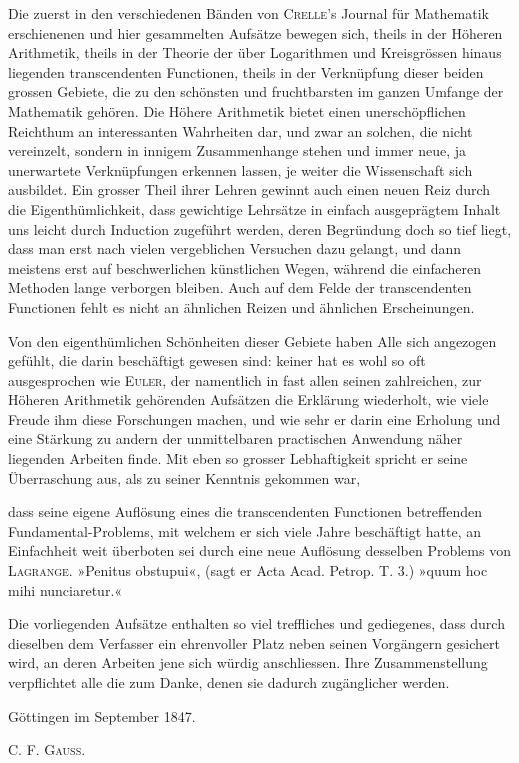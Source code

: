 \NoSourceHead
{}

Die zuerst in den verschiedenen Bänden von \textsc{Crelle}'s Journal für Mathematik erschienenen und hier gesammelten Aufsätze bewegen sich, theils in der Höheren Arithmetik, theils in der Theorie der über Logarithmen und Kreisgrössen hinaus liegenden transcendenten Functionen, theils in der Verknüpfung dieser beiden grossen Gebiete, die zu den schönsten und fruchtbarsten im ganzen Umfange der Mathematik gehören. Die Höhere Arithmetik bietet einen unerschöpflichen Reichthum an interessanten Wahrheiten dar, und zwar an solchen, die nicht vereinzelt, sondern in innigem Zusammenhange stehen und immer neue, ja unerwartete Verknüpfungen erkennen lassen, je weiter die Wissenschaft sich ausbildet. Ein grosser Theil ihrer Lehren gewinnt auch einen neuen Reiz durch die Eigenthümlichkeit, dass gewichtige Lehrsätze in einfach ausgeprägtem Inhalt uns leicht durch Induction zugeführt werden, deren Begründung doch so tief liegt, dass man erst nach vielen vergeblichen Versuchen dazu gelangt, und dann meistens erst auf beschwerlichen künstlichen Wegen, während die einfacheren Methoden lange verborgen bleiben. Auch auf dem Felde der transcendenten Functionen fehlt es nicht an ähnlichen Reizen und ähnlichen Erscheinungen.

Von den eigenthümlichen Schönheiten dieser Gebiete haben Alle sich angezogen gefühlt, die darin beschäftigt gewesen sind: keiner hat es wohl so oft ausgesprochen wie \textsc{Euler}, der namentlich in fast allen seinen zahlreichen, zur Höheren Arithmetik gehörenden Aufsätzen die Erklärung wiederholt, wie viele Freude ihm diese Forschungen machen, und wie sehr er darin eine Erholung und eine Stärkung zu andern der unmittelbaren practischen Anwendung näher liegenden Arbeiten finde. Mit eben so grosser Lebhaftigkeit spricht er seine Überraschung aus, als zu seiner Kenntnis gekommen war,
\par\clearpage{}\noindent
dass seine eigene Auflösung eines die transcendenten Functionen betreffenden Fundamen\-tal-Problems, mit welchem er sich viele Jahre beschäftigt hatte, an Einfachheit weit überboten sei durch eine neue Auflösung desselben Problems von \textsc{Lagrange}. »Penitus obstupui«, (sagt er Acta Acad. Petrop. T. 3.) »quum hoc mihi nunciaretur.«

Die vorliegenden Aufsätze enthalten so viel treffliches und gediegenes, dass durch dieselben dem Verfasser ein ehrenvoller Platz neben seinen Vorgängern gesichert wird, an deren Arbeiten jene sich würdig anschliessen. Ihre Zusammenstellung verpflichtet alle die zum Danke, denen sie dadurch zugänglicher werden.

\bigskip\noindent Göttingen im September 1847.
\begin{flushright}C. F. \textsc{Gauss}.\end{flushright}
\ClosingRule
\clearpage
